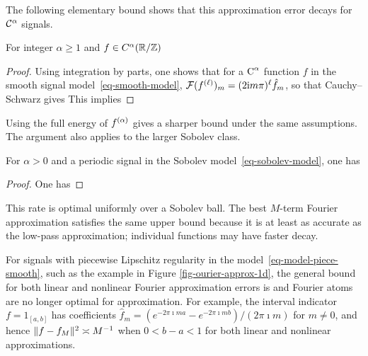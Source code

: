 The following elementary bound shows that this approximation error decays for $\mathcal{C}^\alpha$ signals.

\begin{prop}
	For integer $\alpha\geq1$ and $f\in C^\alpha(\mathbb{R}/\mathbb{Z})$
\end{prop}

\begin{proof}
Using integration by parts, one shows that for a $\text{C}^\alpha$ function $f$ in the smooth signal model~\eqref{eq-smooth-model},
$\mathcal{F}(f^{(\ell)})_m = (2\mathrm{i} m \pi)^\ell \hat f_m$, so that 
Cauchy--Schwarz gives
This implies
\end{proof}

Using the full energy of $f^{(\alpha)}$ gives a sharper bound under the same assumptions. The argument also applies to the larger Sobolev class.

\begin{prop}\label{prop-sobol-fourier-lin}
	For $\alpha>0$ and a periodic signal in the Sobolev model~\eqref{eq-sobolev-model}, one has
\end{prop}
\begin{proof}
	One has
\end{proof}

This rate is optimal uniformly over a Sobolev ball. The best $M$-term Fourier approximation satisfies the same upper bound because it is at least as accurate as the low-pass approximation; individual functions may have faster decay.

For signals with piecewise Lipschitz regularity in the model~\eqref{eq-model-piece-smooth}, such as the example in Figure \ref{fig-ourier-approx-1d}, the general bound for both linear and nonlinear Fourier approximation errors is
and Fourier atoms are no longer optimal for approximation.
%
For example, the interval indicator $f=1_{[a,b]}$ has coefficients $\hat f_m=(e^{-2\pi\imath ma}-e^{-2\pi\imath mb})/(2\pi\imath m)$ for $m\neq0$, and hence
$\lVert f-f_M\rVert^2\asymp M^{-1}$ when $0<b-a<1$ for both linear and nonlinear approximations.

